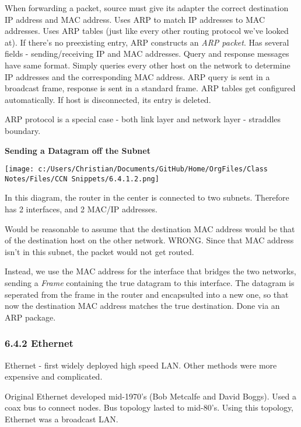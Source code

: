 \documentclass[11pt]{article}
\begin{document}
When forwarding a packet, source must give its adapter the correct destination IP address and MAC address. Uses ARP to match IP addresses to MAC addresses. Uses ARP tables (just like every other routing protocol we've looked at). If there's no preexisting entry, ARP constructs an \emph{ARP packet}. Has several fields - sending/receiving IP and MAC addresses. Query and response messages have same format. Simply queries every other host on the network to determine IP addresses and the corresponding MAC address. ARP query is sent in a broadcast frame, response is sent in a standard frame. ARP tables get configured automatically. If host is disconnected, its entry is deleted.

ARP protocol is a special case - both link layer and network layer - straddles boundary.

\textbf{Sending a Datagram off the Subnet}
\begin{figure*}
\centering
\texttt{[image: c:/Users/Christian/Documents/GitHub/Home/OrgFiles/Class Notes/Files/CCN Snippets/6.4.1.2.png]}
\end{figure*}

In this diagram, the router in the center is connected to two subnets. Therefore has 2 interfaces, and 2 MAC/IP addresses.

Would be reasonable to assume that the destination MAC address would be that of the destination host on the other network. WRONG. Since that MAC address isn't in this subnet, the packet would not get routed.

Instead, we use the MAC address for the interface that bridges the two networks, sending a \emph{Frame} containing the true datagram to this interface. The datagram is seperated from the frame in the router and encapsulted into a new one, so that now the destination MAC address matches the true destination. Done via an ARP package. 

\subsubsection{6.4.2 Ethernet}
\label{sec:orgc4c5a54}

Ethernet - first widely deployed high speed LAN. Other methods were more expensive and complicated.

Original Ethernet developed mid-1970's (Bob Metcalfe and David Boggs).
Used a coax bus to connect nodes.
Bus topology lasted to mid-80's. Using this topology, Ethernet was a broadcast LAN.
\end{document}
